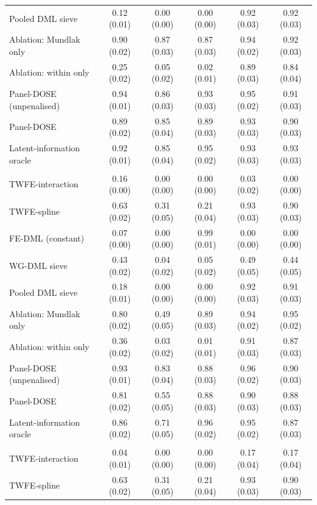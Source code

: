 \documentclass[preprint,12pt,authoryear]{elsarticle}
\begin{document}
\begin{table}[!ht]
\begin{threeparttable}
\begin{tabular}{lccccc}
\quad Pooled DML sieve & 0.12 (0.01) & 0.00 (0.00) & 0.00 (0.00) & 0.92 (0.03) & 0.92 (0.03)\\
\quad Ablation: Mundlak only & 0.90 (0.02) & 0.87 (0.03) & 0.87 (0.03) & 0.94 (0.02) & 0.92 (0.03)\\
\quad Ablation: within only & 0.25 (0.02) & 0.05 (0.02) & 0.02 (0.01) & 0.89 (0.03) & 0.84 (0.04)\\
\quad Panel-DOSE (unpenalised) & 0.94 (0.01) & 0.86 (0.03) & 0.93 (0.03) & 0.95 (0.02) & 0.91 (0.03)\\
\quad Panel-DOSE & 0.89 (0.02) & 0.85 (0.04) & 0.89 (0.03) & 0.93 (0.03) & 0.90 (0.03)\\
\quad Latent-information oracle & 0.92 (0.01) & 0.85 (0.04) & 0.95 (0.02) & 0.93 (0.03) & 0.93 (0.03)\\
\addlinespace
\multicolumn{6}{l}{\textit{Design: threshold $\theta(z)$}}\\
\quad TWFE-interaction & 0.16 (0.00) & 0.00 (0.00) & 0.00 (0.00) & 0.03 (0.02) & 0.00 (0.00)\\
\quad TWFE-spline & 0.63 (0.02) & 0.31 (0.05) & 0.21 (0.04) & 0.93 (0.03) & 0.90 (0.03)\\
\quad FE-DML (constant) & 0.07 (0.00) & 0.00 (0.00) & 0.99 (0.01) & 0.00 (0.00) & 0.00 (0.00)\\
\quad WG-DML sieve & 0.43 (0.02) & 0.04 (0.02) & 0.05 (0.02) & 0.49 (0.05) & 0.44 (0.05)\\
\quad Pooled DML sieve & 0.18 (0.01) & 0.00 (0.00) & 0.00 (0.00) & 0.92 (0.03) & 0.91 (0.03)\\
\quad Ablation: Mundlak only & 0.80 (0.02) & 0.49 (0.05) & 0.89 (0.03) & 0.94 (0.02) & 0.95 (0.02)\\
\quad Ablation: within only & 0.36 (0.02) & 0.03 (0.02) & 0.01 (0.01) & 0.91 (0.03) & 0.87 (0.03)\\
\quad Panel-DOSE (unpenalised) & 0.93 (0.01) & 0.83 (0.04) & 0.88 (0.03) & 0.96 (0.02) & 0.90 (0.03)\\
\quad Panel-DOSE & 0.81 (0.02) & 0.55 (0.05) & 0.88 (0.03) & 0.90 (0.03) & 0.88 (0.03)\\
\quad Latent-information oracle & 0.86 (0.02) & 0.71 (0.05) & 0.96 (0.02) & 0.95 (0.02) & 0.87 (0.03)\\
\addlinespace
\multicolumn{6}{l}{\textit{Design: hump $\theta(z)$}}\\
\quad TWFE-interaction & 0.04 (0.01) & 0.00 (0.00) & 0.00 (0.00) & 0.17 (0.04) & 0.17 (0.04)\\
\quad TWFE-spline & 0.63 (0.02) & 0.31 (0.05) & 0.21 (0.04) & 0.93 (0.03) & 0.90 (0.03)\\

\end{tabular}
\end{threeparttable}
\end{table}
\end{document}
